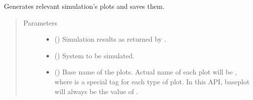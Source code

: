 \documentclass[a4paper,landscape,10pt,english]{sphinxmanual}
\begin{document}

\begin{fulllineitems}
\label{\detokenize{code_docs/simulation_api.controller:simulation_api.controller.tasks._plot_solution}}
Generates relevant simulation’s plots and saves them.
\begin{quote}\begin{description}
\item[{Parameters}] \leavevmode\begin{itemize}
\item {} 
 ({\hyperref[\detokenize{code_docs/simulation_api.controller:simulation_api.controller.schemas.SimResults}]{}}) \textendash{} Simulation results as returned by
{\hyperref[\detokenize{code_docs/simulation_api.simulation:simulation_api.simulation.simulations.Simulation.simulate}]{}}.

\item {} 
 ({\hyperref[\detokenize{code_docs/simulation_api.controller:simulation_api.controller.schemas.SimSystem}]{}}) \textendash{} System to be simulated.

\item {} 
 () \textendash{} Base name of the plots. Actual name of each plot will be
, where 
is a special tag for each type of plot. In this API, baseplot will
always be the value of
{\hyperref[\detokenize{code_docs/simulation_api.controller:simulation_api.controller.schemas.SimIdResponse.sim_id}]{}}.


\end{itemize}
\end{description}
\end{quote}
\end{fulllineitems}
\end{document}
